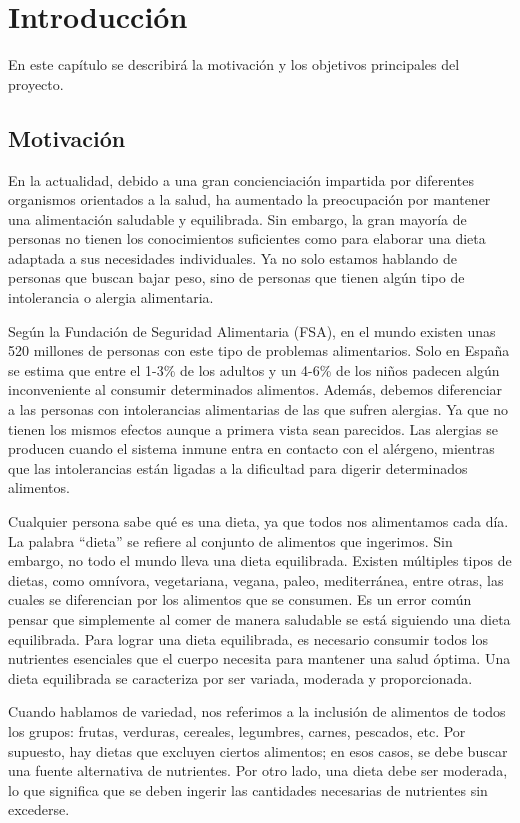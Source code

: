 \chapter{Introducción}
En este capítulo se describirá la motivación y los objetivos principales del proyecto.

\section{Motivación}
En la actualidad, debido a una gran concienciación impartida por diferentes organismos orientados a la salud, ha aumentado la preocupación por mantener una alimentación saludable y equilibrada. Sin embargo, la gran mayoría de personas no tienen los conocimientos suficientes como para elaborar una dieta adaptada a sus necesidades individuales. Ya no solo estamos hablando de personas que buscan bajar peso, sino de personas que tienen algún tipo de intolerancia o alergia alimentaria.

Según la Fundación de Seguridad Alimentaria (FSA), en el mundo existen unas 520 millones de personas con este tipo de problemas alimentarios. Solo en España se estima que entre el 1-3\% de los adultos y un 4-6\% de los niños padecen algún inconveniente al consumir determinados alimentos. Además, debemos diferenciar a las personas con intolerancias alimentarias de las que sufren alergias. Ya que no tienen los mismos efectos aunque a primera vista sean parecidos. Las alergias se producen cuando el sistema inmune entra en contacto con el alérgeno, mientras que las intolerancias están ligadas a la dificultad para digerir determinados alimentos.\cite{FSA}

Cualquier persona sabe qué es una dieta, ya que todos nos alimentamos cada día. La palabra ``dieta'' se refiere al conjunto de alimentos que ingerimos. Sin embargo, no todo el mundo lleva una dieta equilibrada. Existen múltiples tipos de dietas, como omnívora, vegetariana, vegana, paleo, mediterránea, entre otras, las cuales se diferencian por los alimentos que se consumen.
Es un error común pensar que simplemente al comer de manera saludable se está siguiendo una dieta equilibrada. Para lograr una dieta equilibrada, es necesario consumir todos los nutrientes esenciales que el cuerpo necesita para mantener una salud óptima. Una dieta equilibrada se caracteriza por ser variada, moderada y proporcionada.

Cuando hablamos de variedad, nos referimos a la inclusión de alimentos de todos los grupos: frutas, verduras, cereales, legumbres, carnes, pescados, etc. Por supuesto, hay dietas que excluyen ciertos alimentos; en esos casos, se debe buscar una fuente alternativa de nutrientes. Por otro lado, una dieta debe ser moderada, lo que significa que se deben ingerir las cantidades necesarias de nutrientes sin excederse.

